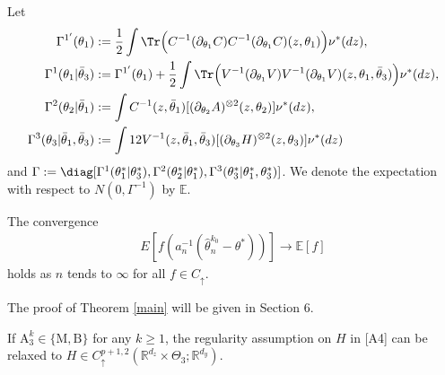 \documentclass[a4paper,11pt]{jsarticle}
\begin{document}

Let
\begin{align}
\Gamma^{1'}(\theta_1) &  :=  \frac{1}{2} \int
        \Tr\Bigl( C^{-1}(\partial_{\theta_1}C)C^{-1}(\partial_{\theta_1}C)(z,\theta_1)\Bigr)  \nu^*(dz), \\ 
    \Gamma^{1}(\theta_1|\bar{\theta}_3) &: = \Gamma^{1'}(\theta_1) + \frac{1}{2} \int  \Tr\Bigl( V^{-1}(\partial_{\theta_1}V) V^{-1} (\partial_{\theta_1} V )(z,\theta_1,\bar{\theta}_3)\Bigr)\nu^*(dz),
    \\
    \Gamma^{2}(\theta_2| \bar{\theta}_1) & := \int C^{-1}(z,\bar{\theta}_1)[(\partial_{\theta_2}A)^{\otimes 2}(z,{\theta}_2) ] \nu^*(dz),
    \\
    \Gamma^{3}(\theta_3|\bar{\theta}_1,\bar{\theta}_3) & := \int 12V^{-1}(z,\bar{\theta}_1,\bar{\theta}_3)[(\partial_{\theta_3} H)^{\otimes 2}(z,\theta_3) ] \nu^*(dz)
\end{align}
and $\Gamma:= \diag[\Gamma^1(\theta_1^*|\theta_3^*),\Gamma^2(\theta_2^*|\theta_1^*),\Gamma^3(\theta_3^*|\theta_1^*,\theta_3^*)] $. We denote the expectation with respect to $N(0,\Gamma^{-1})$ by $\mathbb{E}$. 


\begin{theorem}\label{main}
The convergence
\begin{align}
    E[f(a_n^{-1}( \hat{\theta  }_n^{k_0  }  - \theta^*) )] \to \mathbb{E}[f]
\end{align}
holds as $n $ tends to $\infty$ for all $f\in C_\uparrow$.
\end{theorem}

The proof of Theorem \ref{main} will be given in Section 6.
\begin{remark}
    If $\text{A}_3^k \in \{\text{M},\text{B} \} $ for any $k \geq 1$, the regularity assumption on $H$ in [A4] can be relaxed to $H \in C^{p+1,2}_\uparrow(\mathbb{R}^{d_z} \times \Theta_3 ;\mathbb{R}^{d_y})$.
\end{remark}
\end{document}
